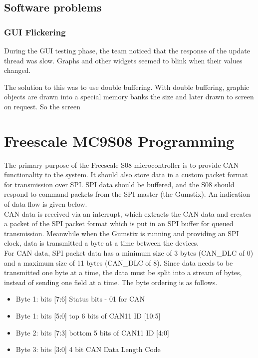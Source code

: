 \documentclass[11pt]{report} %
\begin{document}
	\subsection{Software problems}
	\subsubsection{GUI Flickering}
	 During the GUI testing phase, the team noticed that the response of the update thread was slow.
	 Graphs and other widgets seemed to blink when their values changed.
	 
	 The solution to this was to use double buffering. With double buffering, graphic objects are
	 drawn into a special memory banks the size  and later drawn to screen on request. So the screen 
				
	\section{Freescale MC9S08 Programming}
	The primary purpose of the Freescale S08 microcontroller is to provide CAN
	functionality to the system. It should also store data in a custom packet
	format for transmission over SPI. SPI data should be buffered, and the S08
	should respond to command packets from the SPI master (the Gumstix). An
	indication of data flow is given below.\\
	
	CAN data is received via an interrupt, which extracts the CAN data and
	creates a packet of the SPI packet format which is put in an SPI buffer
	for queued transmission. Meanwhile when the Gumstix is running and
	providing an SPI clock, data is transmitted a byte at a time between the
	devices.\\
	
	For CAN data, SPI packet data has a minimum size of 3 bytes (CAN\_DLC of 0)
	and a maximum size
	of 11 bytes (CAN\_DLC of 8). Since data needs to be transmitted one byte at
	a time, the data must be split into a stream of bytes, instead of sending
	one field at a time. The byte ordering is as follows.
	
	\begin{itemize}
		\item Byte 1: bits [7:6] Status bits - 01 for CAN 
		\item Byte 1: bits [5:0] top 6 bits of CAN11 ID [10:5]
		\item Byte 2: bits [7:3] bottom 5 bits of CAN11 ID [4:0]
		\item Byte 3: bits [3:0] 4 bit CAN Data Length Code
	\end{itemize}
	
\end{document}
